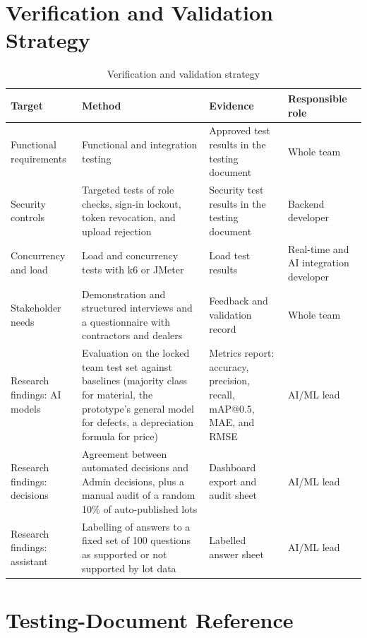 \section{Verification and Validation Strategy}
\begin{table}[H]
\centering
\caption{Verification and validation strategy}
\label{tab:vv-strategy}
\footnotesize
\begin{tabularx}{\textwidth}{@{}>{\raggedright\arraybackslash}p{}>{\raggedright\arraybackslash}X >{\raggedright\arraybackslash}X >{\raggedright\arraybackslash}p{}@{}}
\toprule
\textbf{Target} & \textbf{Method} & \textbf{Evidence} & \textbf{Responsible role} \\
\midrule
Functional requirements & Functional and integration testing & Approved test results in the testing document & Whole team \\
Security controls & Targeted tests of role checks, sign-in lockout, token revocation, and upload rejection & Security test results in the testing document & Backend developer \\
Concurrency and load & Load and concurrency tests with k6 or JMeter & Load test results & Real-time and AI integration developer \\
Stakeholder needs & Demonstration and structured interviews and a questionnaire with contractors and dealers & Feedback and validation record & Whole team \\
Research findings: AI models & Evaluation on the locked team test set against baselines (majority class for material, the prototype's general model for defects, a depreciation formula for price) & Metrics report: accuracy, precision, recall, mAP@0.5, MAE, and RMSE & AI/ML lead \\
Research findings: decisions & Agreement between automated decisions and Admin decisions, plus a manual audit of a random 10\% of auto-published lots & Dashboard export and audit sheet & AI/ML lead \\
Research findings: assistant & Labelling of answers to a fixed set of 100 questions as supported or not supported by lot data & Labelled answer sheet & AI/ML lead \\
\bottomrule
\end{tabularx}
\end{table}

\section{Testing-Document Reference}

